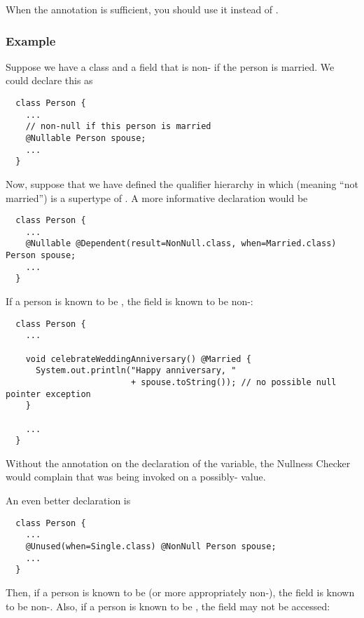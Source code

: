 When the  annotation is sufficient, you
should use it instead of .


\subsubsection{Example\label{dependent-types-example}}

Suppose we have a class  and a field  that is
non- if the person is married.  We could declare this as

\begin{Verbatim}
  class Person {
    ...
    // non-null if this person is married
    @Nullable Person spouse;
    ...
  }
\end{Verbatim}

Now, suppose that we have defined the qualifier hierarchy in which 
 (meaning ``not married'') is a supertype of .
A more informative declaration would be

\begin{Verbatim}
  class Person {
    ...
    @Nullable @Dependent(result=NonNull.class, when=Married.class) Person spouse;
    ...
  }
\end{Verbatim}

If a person is known to be , the
 field is known to be non-:

\begin{Verbatim}
  class Person {
    ...

    void celebrateWeddingAnniversary() @Married {
      System.out.println("Happy anniversary, "
                         + spouse.toString()); // no possible null pointer exception
    }

    ...
  }
\end{Verbatim}

Without the  annotation on the
declaration of the  variable, the Nullness Checker would
complain that  was being invoked on a possibly-
value.

An even better declaration is

\begin{Verbatim}
  class Person {
    ...
    @Unused(when=Single.class) @NonNull Person spouse;
    ...
  }
\end{Verbatim}

Then, if a person is known to be  (or more
appropriately non-), the  field is known to
be non-.  Also, if a person is known to be ,
the  field may not be accessed:
 
